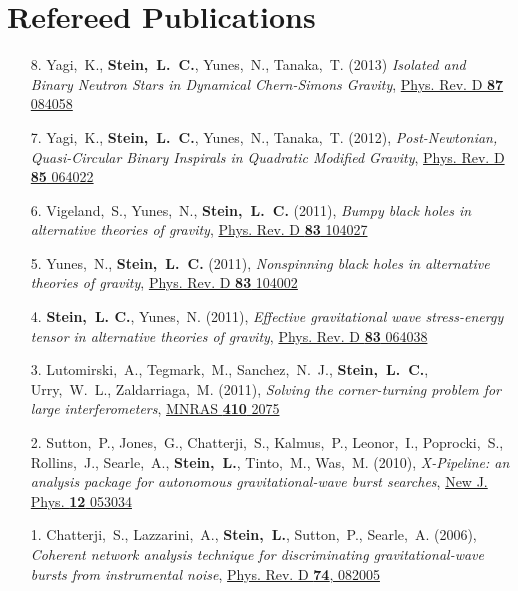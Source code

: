 \section{\sc Refereed Publications}
\begin{enumerate}
\item[{8.}] Yagi,~K., {\bf Stein,~L.~C.}, Yunes,~N., Tanaka,~T. (2013)
  {\it Isolated and Binary Neutron Stars in Dynamical Chern-Simons
    Gravity},
  \href{http://arxiv.org/abs/1302.1918}{Phys. Rev. D {\bf 87} 084058}
\item[{7.}] Yagi,~K., {\bf Stein,~L.~C.}, Yunes,~N.,
  Tanaka,~T. (2012), {\it Post-Newtonian, Quasi-Circular Binary
    Inspirals in Quadratic Modified Gravity},
  \href{http://arxiv.org/abs/1110.5950}{Phys. Rev. D {\bf 85} 064022}
\item[{6.}] Vigeland,~S., Yunes,~N., {\bf Stein,~L.~C.} (2011), {\it
    Bumpy black holes in alternative theories of gravity},
  \href{http://arxiv.org/abs/1102.3706}{Phys. Rev. D {\bf 83} 104027}
\item[{5.}] Yunes,~N., {\bf Stein,~L.~C.} (2011), {\it Nonspinning
    black holes in alternative theories of gravity},
  \href{http://arxiv.org/abs/1101.2921}{Phys. Rev. D {\bf 83} 104002}
\item[{4.}] {\bf Stein,~L. C.}, Yunes,~N. (2011), {\it Effective
    gravitational wave stress-energy tensor in alternative theories of
    gravity},
  \href{http://arxiv.org/abs/1012.3144}{Phys. Rev. D {\bf 83} 064038}
\item[{3.}] Lutomirski,~A., Tegmark,~M., Sanchez,~N.~J., {\bf
    Stein,~L.~C.},
  Urry,~W.~L., Zaldarriaga,~M. (2011), {\it Solving the
    corner-turning problem for large interferometers},
  \href{http://arxiv.org/abs/0910.1351}{MNRAS {\bf 410} 2075}
\item[{2.}] Sutton,~P., Jones,~G., Chatterji,~S., Kalmus,~P., Leonor,~I.,
  Poprocki,~S., Rollins,~J., Searle,~A., {\bf Stein,~L.}, Tinto,~M.,
  Was,~M. (2010), {\it X-Pipeline: an analysis package for autonomous
    gravitational-wave burst searches},
  \href{http://arxiv.org/abs/0908.3665}{New J. Phys. {\bf 12} 053034}
\item[{1.}] Chatterji,~S., Lazzarini,~A., {\bf Stein,~L.}, Sutton,~P.,
  Searle,~A. (2006), {\it Coherent network analysis technique for
    discriminating gravitational-wave bursts from instrumental noise},
  \href{http://arxiv.org/abs/gr-qc/0605002}{Phys. Rev. D {\bf 74}, 082005}
\end{enumerate}

